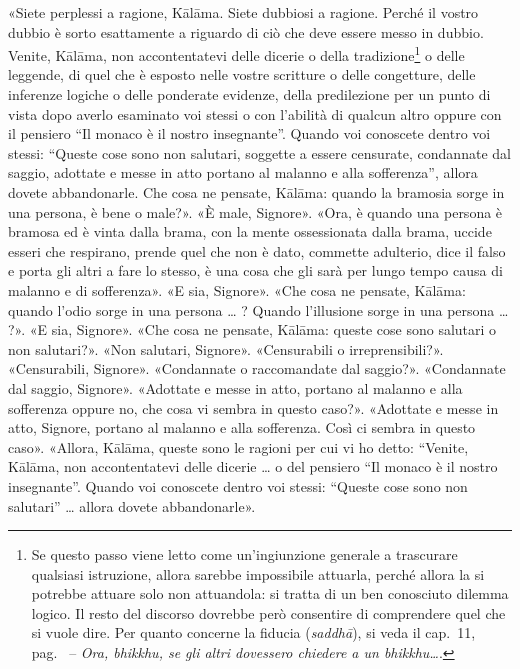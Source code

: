 «Siete perplessi a ragione, Kālāma. Siete dubbiosi a ragione. Perché il vostro
dubbio è sorto esattamente a riguardo di ciò che deve essere messo in dubbio.
Venite, Kālāma, non accontentatevi delle dicerie o della tradizione\footnote{%
  Se questo passo viene letto come un’ingiunzione generale a trascurare
  qualsiasi istruzione, allora sarebbe impossibile attuarla, perché allora la si
  potrebbe attuare solo non attuandola: si tratta di un ben conosciuto dilemma
  logico. Il resto del discorso dovrebbe però consentire di comprendere quel che
  si vuole dire. Per quanto concerne la fiducia (\emph{saddhā}), si veda il
  cap.~11, pag.~\pageref{pag222} -- \emph{Ora, bhikkhu, se gli altri dovessero
    chiedere a un bhikkhu\ldots}.}
o delle leggende, di quel che è esposto nelle vostre scritture o delle
congetture, delle inferenze logiche o delle ponderate evidenze, della
predilezione per un punto di vista dopo averlo esaminato voi stessi o con
l’abilità di qualcun altro oppure con il pensiero “Il monaco è il nostro
insegnante”. Quando voi conoscete dentro voi stessi: “Queste cose sono non
salutari, soggette a essere censurate, condannate dal saggio, adottate e messe
in atto portano al malanno e alla sofferenza”, allora dovete abbandonarle. Che
cosa ne pensate, Kālāma: quando la bramosia sorge in una persona, è bene o
male?». «È male, Signore». «Ora, è quando una persona è bramosa ed è vinta dalla
brama, con la mente ossessionata dalla brama, uccide esseri che respirano,
prende quel che non è dato, commette adulterio, dice il falso e porta gli altri
a fare lo stesso, è una cosa che gli sarà per lungo tempo causa di malanno e di
sofferenza». «E sia, Signore». «Che cosa ne pensate, Kālāma: quando l’odio sorge
in una persona … ? Quando l’illusione sorge in una persona … ?». «E sia,
Signore». «Che cosa ne pensate, Kālāma: queste cose sono salutari o non
salutari?». «Non salutari, Signore». «Censurabili o irreprensibili?».
«Censurabili, Signore». «Condannate o raccomandate dal saggio?». «Condannate dal
saggio, Signore». «Adottate e messe in atto, portano al malanno e alla
sofferenza oppure no, che cosa vi sembra in questo caso?». «Adottate e messe in
atto, Signore, portano al malanno e alla sofferenza. Così ci sembra in questo
caso». «Allora, Kālāma, queste sono le ragioni per cui vi ho detto: “Venite,
Kālāma, non accontentatevi delle dicerie … o del pensiero “Il monaco è il nostro
insegnante”. Quando voi conoscete dentro voi stessi: “Queste cose sono non
salutari” … allora dovete abbandonarle».

